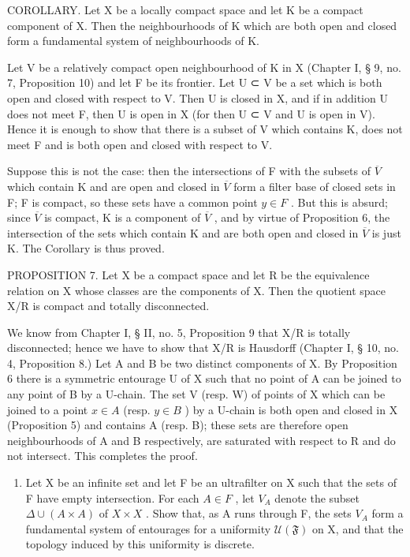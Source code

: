 COROLLARY. Let X be a locally compact space and let K be a compact component of X. Then the neighbourhoods of K which are both open and closed form a fundamental system of neighbourhoods of K.

Let V be a relatively compact open neighbourhood of K in X (Chapter I, § 9, no. 7, Proposition 10) and let F be its frontier. Let U ⊂ V be a set which is both open and closed with respect to V. Then U is closed in X, and if in addition U does not meet F, then U is open in X (for then U ⊂ V and U is open in V). Hence it is enough to show that there is a subset of V which contains K, does not meet F and is both open and closed with respect to V.

Suppose this is not the case: then the intersections of F with the subsets of \(\overline{V}\) which contain K and are open and closed in \(\overline{V}\) form a filter base of closed sets in F; F is compact, so these sets have a common point \(y \in F\) . But this is absurd; since \(\overline{V}\) is compact, K is a component of \(\overline{V}\) , and by virtue of Proposition 6, the intersection of the sets which contain K and are both open and closed in \(\overline{V}\) is just K. The Corollary is thus proved.

PROPOSITION 7. Let X be a compact space and let R be the equivalence relation on X whose classes are the components of X. Then the quotient space X/R is compact and totally disconnected.

We know from Chapter I, § II, no. 5, Proposition 9 that X/R is totally disconnected; hence we have to show that X/R is Hausdorff (Chapter I, § 10, no. 4, Proposition 8.) Let A and B be two distinct components of X. By Proposition 6 there is a symmetric entourage U of X such that no point of A can be joined to any point of B by a U-chain. The set V (resp. W) of points of X which can be joined to a point \(x \in A\) (resp. \(y \in B\) ) by a U-chain is both open and closed in X (Proposition 5) and contains A (resp. B); these sets are therefore open neighbourhoods of A and B respectively, are saturated with respect to R and do not intersect. This completes the proof.

\BourbakiExercises

\BourbakiExerciseGroup

\begin{enumerate}
\def\labelenumi{\arabic{enumi})}
\tightlist
\item
  Let X be an infinite set and let F be an ultrafilter on X such that the sets of F have empty intersection. For each \(A \in F\) , let \(V_{A}\) denote the subset \(\Delta \cup (A \times A)\) of \(X \times X\) . Show that, as A runs through F, the sets \(V_{A}\) form a fundamental system of entourages for a uniformity \(\mathcal{U}(\mathfrak{F})\) on X, and that the topology induced by this uniformity is discrete.
\end{enumerate}

